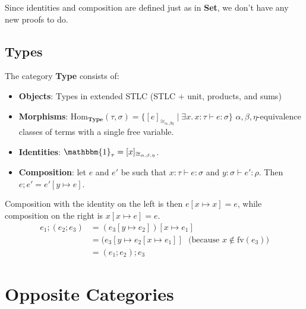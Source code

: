 \documentclass{lecturenotes}
\renewcommand{\hom}[3][]{\ensuremath{\text{Hom}_{#1}(#2, #3)}}
\newcommand{\id}[1][]{\ensuremath{\mathbbm{1}_{#1}}}
\newcommand{\Set}{\textbf{Set}\xspace}
\newcommand{\Type}{\textbf{Type}\xspace}
\begin{document}
Since identities and composition are defined just as in \Set, we don't have any new proofs to do.

\subsection{Types}
\label{sec:types}

The category \Type consists of:
\begin{itemize}
\item \textbf{Objects}: Types in extended STLC (STLC + unit, products, and sums)
\item \textbf{Morphisms}: $\hom[\Type]{\tau}{\sigma} = \{ [e]_{\cong_{\alpha,\beta\eta}} \mid \exists x.\, x : \tau  \vdash e : \sigma\}$ $\alpha,\beta,\eta$-equivalence classes of terms with a single free variable.
\item \textbf{Identities}: $\id[\tau] = [x]_{\cong_{\alpha,\beta,\eta}}$.
\item \textbf{Composition}: let $e$ and $e'$ be such that $x : \tau \vdash e : \sigma$ and $y : \sigma \vdash e' : \rho$.
  Then $e; e' = e'[y \mapsto e]$.
\end{itemize}

Composition with the identity on the left is then $e[x \mapsto x] = e$, while composition on the right is $x[x \mapsto e] = e$.
$$
\begin{array}{ll}
  e_1; (e_2; e_3 ) &= (e_3 [y \mapsto e_2]) [x \mapsto e_1]\\
                   &= (e_3[y \mapsto e_2 [x \mapsto e_1]]~~~\text{(because $x \notin \text{fv}(e_3)$)}\\
                   &=(e_1; e_2); e_3
\end{array}
$$

\section{Opposite Categories}
\label{sec:opposite-categories}
\end{document}
